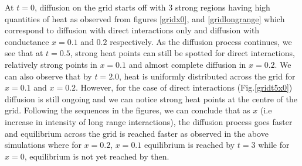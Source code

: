 \documentclass[10pt,a4paper]{article}
\begin{document}
\begin{enumerate}[i)]
\begin{enumerate}[a)]
         		At $t=0$, diffusion on the grid starts off with $3$ strong regions having high quantities of heat as observed from figures \ref{gridx0}, and \ref{gridlongrange} which correspond to diffusion with direct interactions only and diffusion with conductance $x = 0.1$ and $0.2$ respectively. As the diffusion process continues, we see that at $t=0.5$, strong heat points can still be spotted for direct interactions, relatively strong points in $x=0.1$ and almost complete diffusion in $x=0.2$. We can also observe that by $t=2.0$, heat is uniformly distributed across the grid for $x=0.1$ and $x=0.2$. However, for the case of direct interactions (Fig.\ref{gridt5x0}) diffusion is still ongoing and we can notice strong heat points at the centre of the grid. Following the sequences in the figures, we can conclude that as $x$ (i.e increase in intensity of long range interactions), the diffusion process goes faster and equilibrium across the grid is reached faster as observed in the above simulations where for $x=0.2$, $x=0.1$ equilibrium is reached by $t=3$ while for $x=0$, equilibrium is not yet reached by then.
         		 

\end{enumerate}
\end{enumerate}
\end{document}
